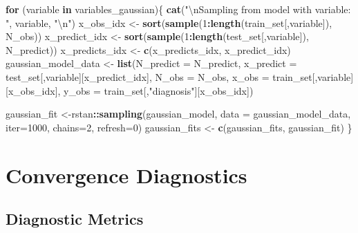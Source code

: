 \documentclass[
]{article}
\newenvironment{Shaded}{\begin{snugshade}}{\end{snugshade}}
\newcommand{\CharTok}[1]{\textcolor[rgb]{0.31,0.60,0.02}{#1}}
\newcommand{\ControlFlowTok}[1]{\textcolor[rgb]{0.13,0.29,0.53}{\textbf{#1}}}
\newcommand{\DataTypeTok}[1]{\textcolor[rgb]{0.13,0.29,0.53}{#1}}
\newcommand{\DecValTok}[1]{\textcolor[rgb]{0.00,0.00,0.81}{#1}}
\newcommand{\KeywordTok}[1]{\textcolor[rgb]{0.13,0.29,0.53}{\textbf{#1}}}
\newcommand{\NormalTok}[1]{#1}
\newcommand{\OperatorTok}[1]{\textcolor[rgb]{0.81,0.36,0.00}{\textbf{#1}}}
\newcommand{\StringTok}[1]{\textcolor[rgb]{0.31,0.60,0.02}{#1}}
\begin{document}
\begin{Shaded}
\begin{Highlighting}[]
\ControlFlowTok{for}\NormalTok{ (variable }\ControlFlowTok{in}\NormalTok{ variables_gaussian)\{}
  \KeywordTok{cat}\NormalTok{(}\StringTok{"}\CharTok{\textbackslash{}n}\StringTok{Sampling from model with variable: "}\NormalTok{, variable, }\StringTok{"}\CharTok{\textbackslash{}n}\StringTok{"}\NormalTok{)}
\NormalTok{  x_obs_idx <-}\StringTok{ }\KeywordTok{sort}\NormalTok{(}\KeywordTok{sample}\NormalTok{(}\DecValTok{1}\OperatorTok{:}\KeywordTok{length}\NormalTok{(train_set[,variable]), N_obs))}
\NormalTok{  x_predict_idx <-}\StringTok{ }\KeywordTok{sort}\NormalTok{(}\KeywordTok{sample}\NormalTok{(}\DecValTok{1}\OperatorTok{:}\KeywordTok{length}\NormalTok{(test_set[,variable]), N_predict))}
\NormalTok{  x_predicts_idx <-}\StringTok{ }\KeywordTok{c}\NormalTok{(x_predicts_idx, x_predict_idx)}
\NormalTok{  gaussian_model_data <-}\StringTok{ }\KeywordTok{list}\NormalTok{(}\DataTypeTok{N_predict =}\NormalTok{ N_predict,}
                              \DataTypeTok{x_predict =}\NormalTok{ test_set[,variable][x_predict_idx],}
                              \DataTypeTok{N_obs =}\NormalTok{ N_obs,}
                              \DataTypeTok{x_obs =}\NormalTok{ train_set[,variable][x_obs_idx],}
                              \DataTypeTok{y_obs =}\NormalTok{ train_set[,}\StringTok{"diagnosis"}\NormalTok{][x_obs_idx])}
  
\NormalTok{  gaussian_fit <-rstan}\OperatorTok{::}\KeywordTok{sampling}\NormalTok{(gaussian_model, }\DataTypeTok{data =}\NormalTok{ gaussian_model_data,}
                                 \DataTypeTok{iter=}\DecValTok{1000}\NormalTok{, }\DataTypeTok{chains=}\DecValTok{2}\NormalTok{, }\DataTypeTok{refresh=}\DecValTok{0}\NormalTok{)}
\NormalTok{  gaussian_fits <-}\StringTok{ }\KeywordTok{c}\NormalTok{(gaussian_fits, gaussian_fit)}
\NormalTok{\}}
\end{Highlighting}
\end{Shaded}

\hypertarget{convergence-diagnostics}{%
\section{Convergence Diagnostics}\label{convergence-diagnostics}}

\hypertarget{diagnostic-metrics}{%
\subsection{Diagnostic Metrics}\label{diagnostic-metrics}}
\end{document}

